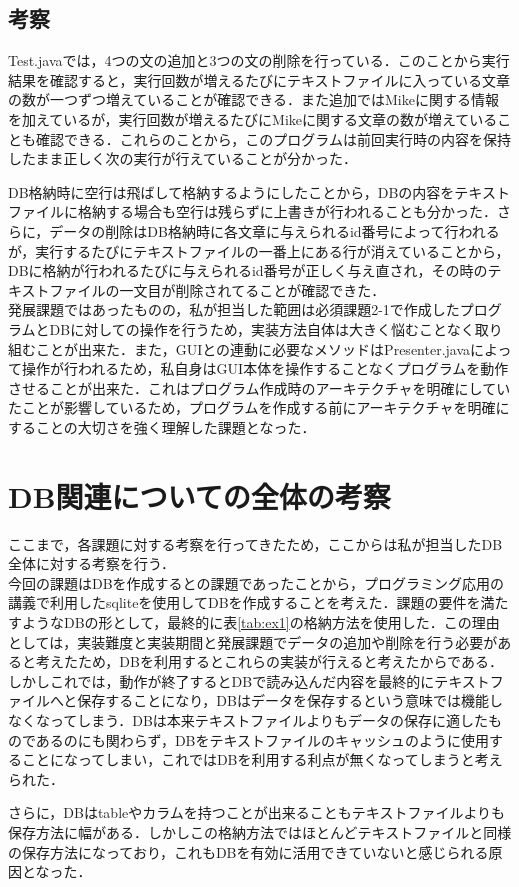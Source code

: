 \documentclass[12pt]{jarticle}
\begin{document}
\subsection{考察}
Test.javaでは，4つの文の追加と3つの文の削除を行っている．このことから実行結果を確認すると，実行回数が増えるたびにテキストファイルに入っている文章の数が一つずつ増えていることが確認できる．また追加ではMikeに関する情報を加えているが，実行回数が増えるたびにMikeに関する文章の数が増えていることも確認できる．これらのことから，このプログラムは前回実行時の内容を保持したまま正しく次の実行が行えていることが分かった．\par
DB格納時に空行は飛ばして格納するようにしたことから，DBの内容をテキストファイルに格納する場合も空行は残らずに上書きが行われることも分かった．さらに，データの削除はDB格納時に各文章に与えられるid番号によって行われるが，実行するたびにテキストファイルの一番上にある行が消えていることから，DBに格納が行われるたびに与えられるid番号が正しく与え直され，その時のテキストファイルの一文目が削除されてることが確認できた．\\

発展課題ではあったものの，私が担当した範囲は必須課題2-1で作成したプログラムとDBに対しての操作を行うため，実装方法自体は大きく悩むことなく取り組むことが出来た．また，GUIとの連動に必要なメソッドはPresenter.javaによって操作が行われるため，私自身はGUI本体を操作することなくプログラムを動作させることが出来た．これはプログラム作成時のアーキテクチャを明確にしていたことが影響しているため，プログラムを作成する前にアーキテクチャを明確にすることの大切さを強く理解した課題となった．

\section{DB関連についての全体の考察}
ここまで，各課題に対する考察を行ってきたため，ここからは私が担当したDB全体に対する考察を行う．\\

今回の課題はDBを作成するとの課題であったことから，プログラミング応用の講義で利用したsqliteを使用してDBを作成することを考えた．課題の要件を満たすようなDBの形として，最終的に表\ref{tab:ex1}の格納方法を使用した．この理由としては，実装難度と実装期間と発展課題でデータの追加や削除を行う必要があると考えたため，DBを利用するとこれらの実装が行えると考えたからである．しかしこれでは，動作が終了するとDBで読み込んだ内容を最終的にテキストファイルへと保存することになり，DBはデータを保存するという意味では機能しなくなってしまう．DBは本来テキストファイルよりもデータの保存に適したものであるのにも関わらず，DBをテキストファイルのキャッシュのように使用することになってしまい，これではDBを利用する利点が無くなってしまうと考えられた．\par
さらに，DBはtableやカラムを持つことが出来ることもテキストファイルよりも保存方法に幅がある．しかしこの格納方法ではほとんどテキストファイルと同様の保存方法になっており，これもDBを有効に活用できていないと感じられる原因となった．\\
\end{document}
